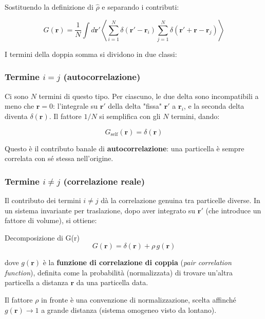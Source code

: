 Sostituendo la definizione di $\hat{\rho}$ e separando i contributi:

$$G(\mathbf{r}) = \frac{1}{N} \int d\mathbf{r}' \left\langle \sum_{i=1}^{N} \delta(\mathbf{r}' - \mathbf{r}_i) \sum_{j=1}^{N} \delta(\mathbf{r}' + \mathbf{r} - \mathbf{r}_j) \right\rangle$$

I termini della doppia somma si dividono in due classi:

\subsubsection{Termine $i = j$ (autocorrelazione)}

Ci sono $N$ termini di questo tipo. Per ciascuno, le due delta sono incompatibili a meno che $\mathbf{r} = 0$: l'integrale su $\mathbf{r}'$ della delta "fissa" $\mathbf{r}'$ a $\mathbf{r}_i$, e la seconda delta diventa $\delta(\mathbf{r})$. Il fattore $1/N$ si semplifica con gli $N$ termini, dando:

$$G_{\text{self}}(\mathbf{r}) = \delta(\mathbf{r})$$

Questo è il contributo banale di \textbf{autocorrelazione}: una particella è sempre correlata con sé stessa nell'origine.

\subsubsection{Termine $i \neq j$ (correlazione reale)}

Il contributo dei termini $i \neq j$ dà la correlazione genuina tra particelle diverse. In un sistema invariante per traslazione, dopo aver integrato su $\mathbf{r}'$ (che introduce un fattore di volume), si ottiene:

\begin{equazione}{Decomposizione di G(r)}
\begin{equation}
G(\mathbf{r}) = \delta(\mathbf{r}) + \rho \, g(\mathbf{r})
\end{equation}
\end{equazione}

dove $g(\mathbf{r})$ è la \textbf{funzione di correlazione di coppia} (\textit{pair correlation function}), definita come la probabilità (normalizzata) di trovare un'altra particella a distanza $\mathbf{r}$ da una particella data.

\begin{nota}
Il fattore $\rho$ in fronte è una convenzione di normalizzazione, scelta affinché $g(\mathbf{r}) \to 1$ a grande distanza (sistema omogeneo visto da lontano).
\end{nota}

